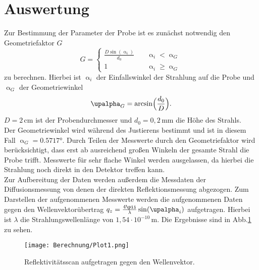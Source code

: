 \section{Auswertung}
Zur Bestimmung der Parameter der Probe ist es zunächst notwendig den Geometriefaktor $G$
\begin{equation}
  G =
     \begin{cases}
       \frac{D\sin\left(\upalpha_i\right)}{d_0} &\quad\upalpha_i<\upalpha_G\\
       1 &\quad\upalpha_i\geq\upalpha_G
     \end{cases}
\end{equation}
zu berechnen. Hierbei ist $\upalpha_i$ der Einfallswinkel der Strahlung auf die Probe und $\upalpha_G$ der Geometriewinkel
\begin{equation}
\upalpha_G=\arcsin\Bigl(\frac{d_0}{D}\Bigr).
\end{equation}
$D=2\,\si{\cm}$ ist der Probendurchmesser und $d_0=0{,}2\,\si{\mm}$ die Höhe des Strahls.\\
 Der Geometriewinkel wird während des Justierens bestimmt und ist in diesem Fall $\upalpha_G=0.5717°$.
Durch Teilen der Messwerte durch den Geometriefaktor wird berücksichtigt, dass erst ab ausreichend großen Winkeln der gesamte Strahl die Probe trifft. Messwerte für sehr flache Winkel werden ausgelassen, da hierbei die Strahlung noch direkt in den Detektor treffen kann.\\
Zur Aufbereitung der Daten werden außerdem die Messdaten der Diffusionsmessung von denen der direkten Reflektionsmessung abgezogen. Zum Darstellen der aufgenommenen Messwerte werden die aufgenommenen Daten gegen den Wellenvektorübertrag $q_z=\frac{4\pii}{\lambda}\sin(\upalpha_i)$ aufgetragen. Hierbei ist $\lambda$ die Strahlungswellenlänge von $1{,}54\cdot10^{-10}\,\si{\m}$. Die Ergebnisse sind in Abb.\ref{Plot1} zu sehen.
\begin{figure}[H]
  \centering
  \texttt{[image: Berechnung/Plot1.png]}
  \caption{Reflektivitätsscan aufgetragen gegen den Wellenvektor.}
  \label{Plot1}
\end{figure}
